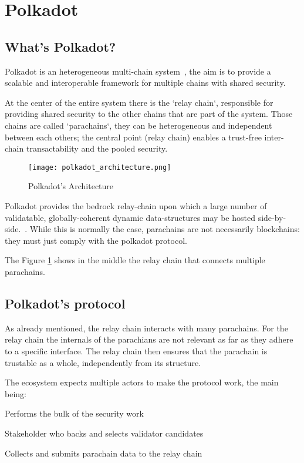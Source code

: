 \documentclass[../main.tex]{subfiles}
\begin{document}
\section{Polkadot}
\subsection{What's Polkadot?}

Polkadot is an heterogeneous multi-chain system~\cite{wood2016polkadot}, the aim is to provide a scalable and interoperable framework for multiple chains with shared security.~\cite{burdges2020overview}

At the center of the entire system there is the `relay chain`, responsible for providing shared security to the other chains that are part of the system. Those chains are called `parachains`, they can be heterogeneous and independent between each others; the central point (relay chain) enables a trust-free inter-chain transactability and the pooled security.~\cite{burdges2020overview}


\begin{figure}[h]
  \centering
  \texttt{[image: polkadot\_architecture.png]}
  \caption{Polkadot's Architecture}
  \label{fig:polkadot_arch}
\end{figure}

Polkadot provides the bedrock relay-chain upon which a large number of validatable, globally-coherent dynamic data-structures may be hosted side-by-side.~\cite{wood2016polkadot}. While this is normally the case, parachains are not necessarily blockchains: they must just comply with the polkadot protocol.

The Figure \ref{fig:polkadot_arch} shows in the middle the relay chain that connects multiple parachains.

\subsection{Polkadot's protocol}

As already mentioned, the relay chain interacts with many parachains. For the relay chain the internals of the parachians are not relevant as far as they adhere to a specific interface. The relay chain then ensures that the parachain is trustable as a whole, independently from its structure.

The ecosystem expectz multiple actors to make the protocol work, the main being:
\begin{description}[font=$\bullet$ \scshape\bfseries]
  \item[Validator] Performs the bulk of the security work
  \item[Nonimator] Stakeholder who backs and selects validator candidates
  \item[Collator] Collects and submits parachain data to the relay chain
\end{description}
\end{document}
